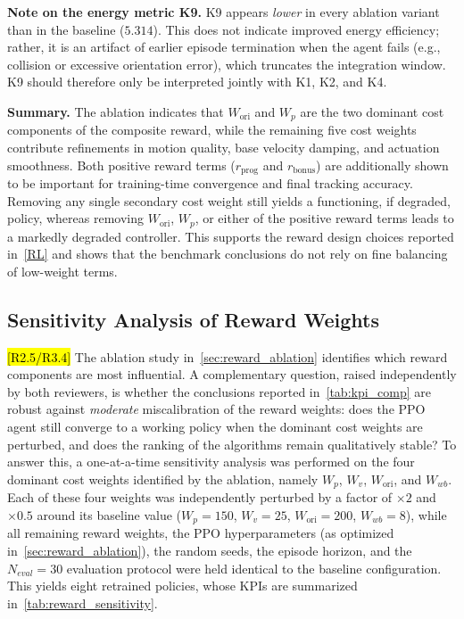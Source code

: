 \documentclass{ieeeaccess}
\newenvironment{rtwohl}
  {\def\FrameCommand{\colorbox{rtwo}}\MakeFramed{\advance\hsize-\width\FrameRestore}}
  {\endMakeFramed}
\newcommand{\hloverlap}[1]{{\sethlcolor{roverlap}\hl{#1}}}
\newenvironment{roverlaphl}
  {\def\FrameCommand{\colorbox{roverlap}}\MakeFramed{\advance\hsize-\width\FrameRestore}}
  {\endMakeFramed}
\begin{document}
\begin{rtwohl}
\noindent\textbf{Note on the energy metric K9.} K9 appears \emph{lower} in every ablation variant than in the baseline ($5.314$).
This does not indicate improved energy efficiency; rather, it is an artifact of earlier episode termination when the agent fails
(e.g., collision or excessive orientation error), which truncates the integration window. K9 should therefore only be interpreted
jointly with K1, K2, and K4.

\noindent\textbf{Summary.} The ablation indicates that $W_{\mathrm{ori}}$ and $W_p$ are the two dominant cost components of the
composite reward, while the remaining five cost weights contribute refinements in motion quality, base velocity damping, and
actuation smoothness. Both positive reward terms ($r_{\text{prog}}$ and $r_{\text{bonus}}$) are additionally shown to be important
for training-time convergence and final tracking accuracy. Removing any single secondary cost weight still yields a functioning,
if degraded, policy, whereas removing $W_{\mathrm{ori}}$, $W_p$, or either of the positive reward terms leads to a markedly
degraded controller. This supports the reward design choices reported in~\autoref{RL} and shows that the benchmark conclusions
do not rely on fine balancing of low-weight terms.
\end{rtwohl}

\subsection{Sensitivity Analysis of Reward Weights}\label{sec:reward_sensitivity}
\begin{roverlaphl}
\hloverlap{[R2.5/R3.4]} The ablation study in~\autoref{sec:reward_ablation} identifies which reward components are
most influential. A complementary question, raised independently by both reviewers, is whether the
conclusions reported in~\autoref{tab:kpi_comp} are robust against \emph{moderate} miscalibration of the reward weights:
does the PPO agent still converge to a working policy when the dominant cost weights are perturbed, and does the
ranking of the algorithms remain qualitatively stable? To answer this, a one-at-a-time sensitivity
analysis was performed on the four dominant cost weights identified by the ablation, namely $W_p$, $W_v$, $W_{\mathrm{ori}}$, and
$W_{wb}$. Each of these four weights was independently perturbed by a factor of $\times 2$ and $\times 0.5$ around its
baseline value ($W_p=150$, $W_v=25$, $W_{\mathrm{ori}}=200$, $W_{wb}=8$), while all remaining reward weights, the
PPO hyperparameters (as optimized in~\autoref{sec:reward_ablation}), the random seeds, the episode horizon, and the
$N_{eval}=30$ evaluation protocol were held identical to the baseline configuration. This yields eight retrained
policies, whose KPIs are summarized in~\autoref{tab:reward_sensitivity}.
\end{roverlaphl}
\end{document}
